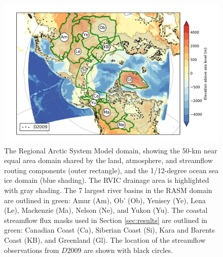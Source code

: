 \documentclass[jgrga, draft]{agutex}
\begin{document}
%
%
%
%

\clearpage
\begin{figure}
\noindent\includegraphics[width=40pc,natwidth=1]{RASM_domain_fig}
\caption{The Regional Arctic System Model domain, showing the 50-km near equal area domain shared by the land, atmosphere, and streamflow routing components (outer rectangle), and the 1/12-degree ocean sea ice domain (blue shading).
The RVIC drainage area is highlighted with gray shading.
The 7 largest river basins in the RASM domain are outlined in green: Amur (Am), Ob' (Ob), Yenisey (Ye), Lena (Le), Mackenzie (Ma), Nelson (Ne), and Yukon (Yu).
The coastal streamflow flux masks used in Section \ref{sec:results} are outlined in green: Canadian Coast (Ca), Siberian Coast (Si), Kara and Barents Coast (KB), and Greenland (Gl). The location of the streamflow observations from $D2009$ are shown with black circles.}
\label{fig:rasm_domain}
\end{figure}
\end{document}
